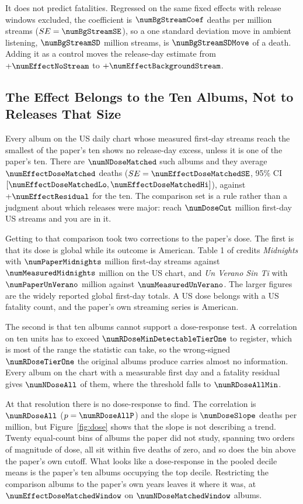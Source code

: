 \documentclass[11pt]{article}
\begin{document}
It does not predict fatalities. Regressed on the same fixed effects with release windows
excluded, the coefficient is $\numBgStreamCoef$ deaths per million streams
($SE = \numBgStreamSE$), so a one standard deviation move in ambient listening,
$\numBgStreamSD$ million streams, is $\numBgStreamSDMove$ of a death. Adding it as a
control moves the release-day estimate from $+\numEffectNoStream$ to
$+\numEffectBackgroundStream$.



\subsection{The Effect Belongs to the Ten Albums, Not to Releases That Size}

Every album on the US daily chart whose measured first-day streams reach the smallest of
the paper's ten shows no release-day excess, unless it is one of the paper's ten. There
are $\numNDoseMatched$ such albums and they average $\numEffectDoseMatched$ deaths
($SE = \numEffectDoseMatchedSE$, 95\% CI $[\numEffectDoseMatchedLo,
\numEffectDoseMatchedHi]$), against $+\numEffectResidual$ for the ten. The comparison set
is a rule rather than a judgment about which releases were major: reach
$\numDoseCut$ million first-day US streams and you are in it.

Getting to that comparison took two corrections to the paper's dose. The first is that
its dose is global while its outcome is American. Table 1 of
\citet{patel2026smartphones} credits \emph{Midnights} with $\numPaperMidnights$ million
first-day streams against $\numMeasuredMidnights$ million on the US chart, and
\emph{Un Verano Sin Ti} with $\numPaperUnVerano$ million against
$\numMeasuredUnVerano$. The larger figures are the widely reported global first-day
totals. A US dose belongs with a US fatality count, and the paper's own streaming series
is American.

The second is that ten albums cannot support a dose-response test. A correlation on ten
units has to exceed $\numRDoseMinDetectableTierOne$ to register, which is most of the
range the statistic can take, so the wrong-signed $\numRDoseTierOne$ the original albums
produce carries almost no information. Every album on the chart with a measurable first
day and a fatality residual gives $\numNDoseAll$ of them, where the threshold falls to
$\numRDoseAllMin$.

At that resolution there is no dose-response to find. The correlation is
$\numRDoseAll$ ($p = \numRDoseAllP$) and the slope is $\numDoseSlope$ deaths per million,
but Figure~\ref{fig:dose} shows that the slope is not describing a trend. Twenty
equal-count bins of albums the paper did not study, spanning two orders of magnitude of
dose, all sit within five deaths of zero, and so does the bin above the paper's own
cutoff. What looks like a dose-response in the pooled decile means is the paper's ten
albums occupying the top decile. Restricting the comparison albums to the paper's own
years leaves it where it was, at $\numEffectDoseMatchedWindow$ on
$\numNDoseMatchedWindow$ albums.
\end{document}
